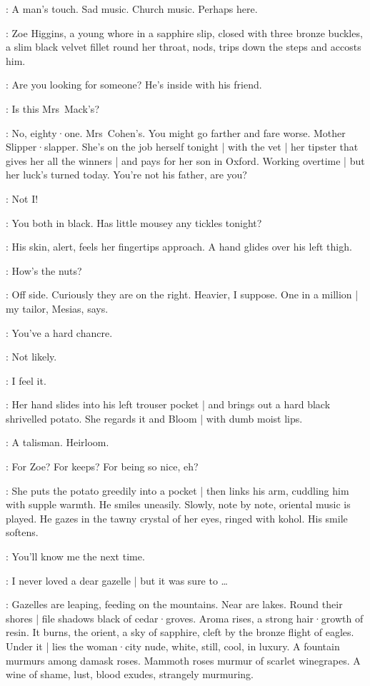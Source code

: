 \Bloom:
A man's touch.
Sad music.
Church music.
Perhaps here.

:
Zoe Higgins,
a young whore in a sapphire slip,
closed with three bronze buckles,
a slim black velvet fillet round her throat,
nods,
trips down the steps and accosts him.

\Zoe:
Are you looking for someone?
He's inside with his friend.

\Bloom:
Is this Mrs~Mack's?

\Zoe:
No,
eighty·one.
Mrs~Cohen's.
You might go farther and fare worse.
Mother Slipper·slapper.
She's on the job herself tonight |
with the vet |
her tipster that gives her all the winners |
and pays for her son in Oxford.
Working overtime |
but her luck's turned today.
You're not his father,
are you?

\Bloom:
Not I!

\Zoe:
You both in black.
Has little mousey any tickles tonight?

:
His skin,
alert,
feels her fingertips approach.
A hand glides over his left thigh.

\Zoe:
How's the nuts?

\Bloom:
Off side.
Curiously they are on the right.
Heavier,
I suppose.
One in a million |
my tailor,
Mesias,
says.

\Zoe:
You've a hard chancre.

\Bloom:
Not likely.

\Zoe:
I feel it.

:
Her hand slides into his left trouser pocket |
and brings out a hard black shrivelled potato.
She regards it and Bloom |
with dumb moist lips.

\Bloom:
A talisman.
Heirloom.

\Zoe:
For Zoe?
For keeps?
For being so nice,
eh?

:
She puts the potato greedily into a pocket |
then links his arm,
cuddling him with supple warmth.
He smiles uneasily.
Slowly,
note by note,
oriental music is played.
He gazes in the tawny crystal of her eyes,
ringed with kohol.
His smile softens.

\Zoe:
You'll know me the next time.

\Bloom:
I never loved a dear gazelle |
but it was sure to \ldots

:
Gazelles are leaping,
feeding on the mountains.
Near are lakes.
Round their shores |
file shadows black of cedar·groves.
Aroma rises,
a strong hair·growth of resin.
It burns,
the orient,
a sky of sapphire,
cleft by the bronze flight of eagles.
Under it |
lies the woman·city nude,
white,
still,
cool,
in luxury.
A fountain murmurs among damask roses.
Mammoth roses murmur of scarlet winegrapes.
A wine of shame,
lust,
blood exudes,
strangely murmuring.%

